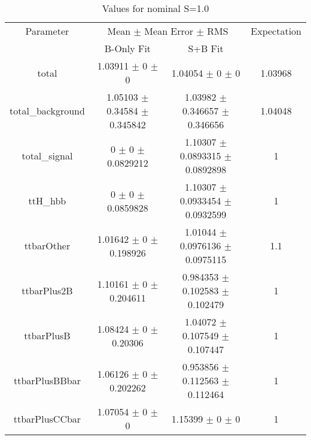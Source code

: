 \begin{table}
\centering
\caption{Values for nominal S=1.0}
\begin{tabular}{cccc}
\toprule
Parameter & \multicolumn{2}{c}{Mean $\pm$ Mean Error $\pm$ RMS} & Expectation\\
 & B-Only Fit & S+B Fit & \\
\midrule
total & \num{1.03911} $\pm$ \num{0} $\pm$ \num{0} & \num{1.04054} $\pm$ \num{0} $\pm$ \num{0} & \num{1.03968}\\
total\_background & \num{1.05103} $\pm$ \num{0.34584} $\pm$ \num{0.345842} & \num{1.03982} $\pm$ \num{0.346657} $\pm$ \num{0.346656} & \num{1.04048}\\
total\_signal & \num{0} $\pm$ \num{0} $\pm$ \num{0.0829212} & \num{1.10307} $\pm$ \num{0.0893315} $\pm$ \num{0.0892898} & \num{1}\\
ttH\_hbb & \num{0} $\pm$ \num{0} $\pm$ \num{0.0859828} & \num{1.10307} $\pm$ \num{0.0933454} $\pm$ \num{0.0932599} & \num{1}\\
ttbarOther & \num{1.01642} $\pm$ \num{0} $\pm$ \num{0.198926} & \num{1.01044} $\pm$ \num{0.0976136} $\pm$ \num{0.0975115} & \num{1.1}\\
ttbarPlus2B & \num{1.10161} $\pm$ \num{0} $\pm$ \num{0.204611} & \num{0.984353} $\pm$ \num{0.102583} $\pm$ \num{0.102479} & \num{1}\\
ttbarPlusB & \num{1.08424} $\pm$ \num{0} $\pm$ \num{0.20306} & \num{1.04072} $\pm$ \num{0.107549} $\pm$ \num{0.107447} & \num{1}\\
ttbarPlusBBbar & \num{1.06126} $\pm$ \num{0} $\pm$ \num{0.202262} & \num{0.953856} $\pm$ \num{0.112563} $\pm$ \num{0.112464} & \num{1}\\
ttbarPlusCCbar & \num{1.07054} $\pm$ \num{0} $\pm$ \num{0} & \num{1.15399} $\pm$ \num{0} $\pm$ \num{0} & \num{1}\\
\bottomrule
\end{tabular}
\end{table}